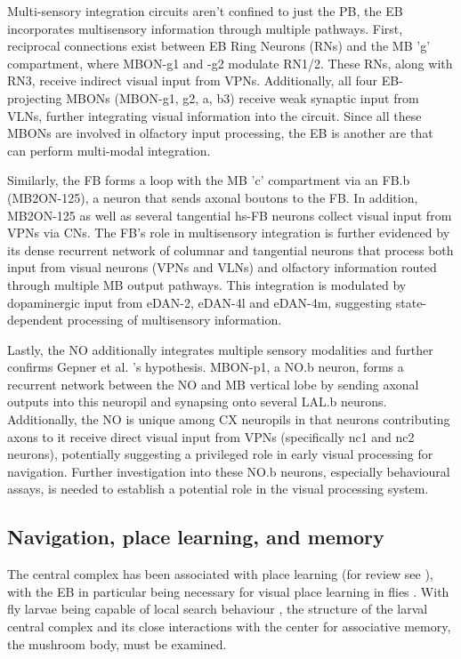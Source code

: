         Multi-sensory integration circuits aren’t confined to just the PB, the EB incorporates multisensory information through multiple pathways. First, reciprocal connections exist between EB Ring Neurons (RNs) and the MB 'g' compartment, where MBON-g1 and -g2 modulate RN1/2. These RNs, along with RN3, receive indirect visual input from VPNs. Additionally, all four EB-projecting MBONs (MBON-g1, g2, a, b3) receive weak synaptic input from VLNs, further integrating visual information into the circuit. Since all these MBONs are involved in olfactory input processing, the EB is another are that can perform multi-modal integration. 

        Similarly, the FB forms a loop with the MB 'c' compartment via an FB.b (MB2ON-125), a neuron that sends axonal boutons to the FB. In addition, MB2ON-125 as well as several tangential hs-FB neurons collect visual input from VPNs via CNs. The FB's role in multisensory integration is further evidenced by its dense recurrent network of columnar and tangential neurons that process both input from visual neurons (VPNs and VLNs) and olfactory information routed through multiple MB output pathways. This integration is modulated by dopaminergic input from eDAN-2, eDAN-4l and eDAN-4m, suggesting state-dependent processing of multisensory information.

        Lastly, the NO additionally integrates multiple sensory modalities and further confirms Gepner et al. 's hypothesis. MBON-p1, a NO.b neuron, forms a recurrent network between the NO and MB vertical lobe by sending axonal outputs into this neuropil and synapsing onto several LAL.b neurons. Additionally, the NO is unique among CX neuropils in that neurons contributing axons to it receive direct visual input from VPNs (specifically nc1 and nc2 neurons), potentially suggesting a privileged role in early visual processing for navigation. Further investigation into these NO.b neurons, especially behavioural assays, is needed to establish a potential role in the visual processing system.

        \subsection{Navigation, place learning, and memory}
        The central complex has been associated with place learning (for review see \citep{PfeifferHomberg2014}), with the EB in particular being necessary for visual place learning in flies \citep{ofstad2011visual}. With fly larvae being capable of local search behaviour \citep{kromp2024localsearch}, the structure of the larval central complex and its close interactions with the center for associative memory, the mushroom body, must be examined.

